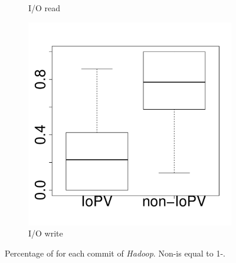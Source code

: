 \documentclass[10pt,journal,compsoc]{IEEEtran}
\begin{document}
\begin{figure}[t]
\begin{subfigure}{0.19\textwidth}
                \caption{I/O read}
        \end{subfigure}
        \begin{subfigure}{0.19\textwidth}
                \includegraphics[width=\linewidth]{Figures/iowrite-hadoop-boxplot.pdf}
                \caption{I/O write}
        \end{subfigure}
        
	\caption{Percentage of \inconsistent for each commit of \emph{Hadoop}. Non-\inconsistent is equal to 1-\inconsistent.} %
	\label{fig:iopv_per_commit_hadoop}
\end{figure}
\end{document}
